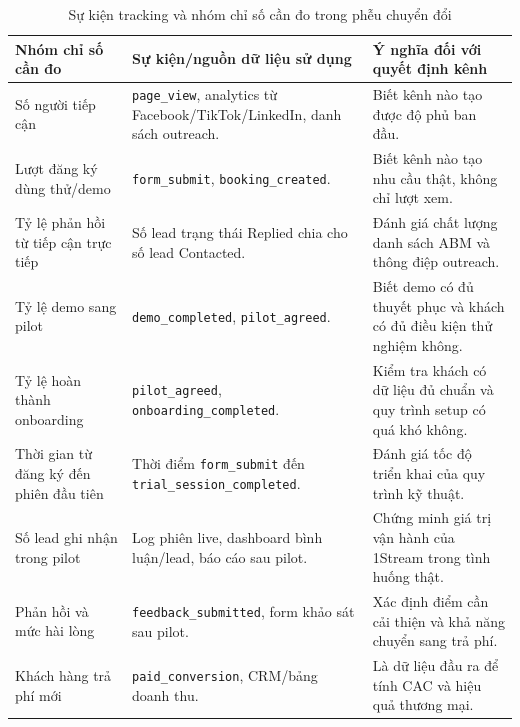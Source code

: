 \begin{table}[H]
    \centering
    \small
    \setlength{\tabcolsep}{4pt}
    \renewcommand{\arraystretch}{1.2}
    \caption{Sự kiện tracking và nhóm chỉ số cần đo trong phễu chuyển đổi}
    \label{tab:tracking-to-kpi-1stream}
    \begin{tabularx}{\linewidth}{@{}L{3.4cm}Y Y@{}}
        \toprule
        \textbf{Nhóm chỉ số cần đo} & \textbf{Sự kiện/nguồn dữ liệu sử dụng} & \textbf{Ý nghĩa đối với quyết định kênh} \\ \midrule

        Số người tiếp cận &
        \texttt{page\_view}, analytics từ Facebook/TikTok/LinkedIn, danh sách
        outreach. &
        Biết kênh nào tạo được độ phủ ban đầu. \\

        Lượt đăng ký dùng thử/demo &
        \texttt{form\_submit}, \texttt{booking\_created}. &
        Biết kênh nào tạo nhu cầu thật, không chỉ lượt xem. \\

        Tỷ lệ phản hồi từ tiếp cận trực tiếp &
        Số lead trạng thái Replied chia cho số lead Contacted. &
        Đánh giá chất lượng danh sách ABM và thông điệp outreach. \\

        Tỷ lệ demo sang pilot &
        \texttt{demo\_completed}, \texttt{pilot\_agreed}. &
        Biết demo có đủ thuyết phục và khách có đủ điều kiện thử nghiệm không. \\

        Tỷ lệ hoàn thành onboarding &
        \texttt{pilot\_agreed}, \texttt{onboarding\_completed}. &
        Kiểm tra khách có dữ liệu đủ chuẩn và quy trình setup có quá khó không. \\

        Thời gian từ đăng ký đến phiên đầu tiên &
        Thời điểm \texttt{form\_submit} đến \texttt{trial\_session\_completed}. &
        Đánh giá tốc độ triển khai của quy trình kỹ thuật. \\

        Số lead ghi nhận trong pilot &
        Log phiên live, dashboard bình luận/lead, báo cáo sau pilot. &
        Chứng minh giá trị vận hành của 1Stream trong tình huống thật. \\

        Phản hồi và mức hài lòng &
        \texttt{feedback\_submitted}, form khảo sát sau pilot. &
        Xác định điểm cần cải thiện và khả năng chuyển sang trả phí. \\

        Khách hàng trả phí mới &
        \texttt{paid\_conversion}, CRM/bảng doanh thu. &
        Là dữ liệu đầu ra để tính CAC và hiệu quả thương mại. \\ \bottomrule
    \end{tabularx}
\end{table}

